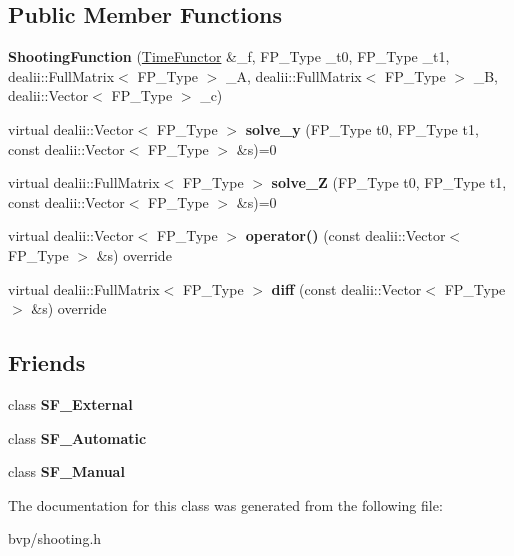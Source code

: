\subsection*{Public Member Functions}
\begin{DoxyCompactItemize}
\item 
\mbox{\label{classShootingFunction_ae73f34f210d7f6836b570ecca21f62c0}} 
{\bfseries Shooting\+Function} (\hyperlink{classTimeFunctor}{Time\+Functor} \&\+\_\+f, F\+P\+\_\+\+Type \+\_\+t0, F\+P\+\_\+\+Type \+\_\+t1, dealii\+::\+Full\+Matrix$<$ F\+P\+\_\+\+Type $>$ \+\_\+A, dealii\+::\+Full\+Matrix$<$ F\+P\+\_\+\+Type $>$ \+\_\+B, dealii\+::\+Vector$<$ F\+P\+\_\+\+Type $>$ \+\_\+c)
\item 
\mbox{\label{classShootingFunction_a2fff86465b3e0ee1e4e29d8691dbd8f5}} 
virtual dealii\+::\+Vector$<$ F\+P\+\_\+\+Type $>$ {\bfseries solve\+\_\+y} (F\+P\+\_\+\+Type t0, F\+P\+\_\+\+Type t1, const dealii\+::\+Vector$<$ F\+P\+\_\+\+Type $>$ \&s)=0
\item 
\mbox{\label{classShootingFunction_a679b8e1483215ced4212dd7acb0001f8}} 
virtual dealii\+::\+Full\+Matrix$<$ F\+P\+\_\+\+Type $>$ {\bfseries solve\+\_\+Z} (F\+P\+\_\+\+Type t0, F\+P\+\_\+\+Type t1, const dealii\+::\+Vector$<$ F\+P\+\_\+\+Type $>$ \&s)=0
\item 
\mbox{\label{classShootingFunction_a02ef732410cfd2168a865e550610d1cf}} 
virtual dealii\+::\+Vector$<$ F\+P\+\_\+\+Type $>$ {\bfseries operator()} (const dealii\+::\+Vector$<$ F\+P\+\_\+\+Type $>$ \&s) override
\item 
\mbox{\label{classShootingFunction_ae848d8431d042e8f1df5bff5f716ed38}} 
virtual dealii\+::\+Full\+Matrix$<$ F\+P\+\_\+\+Type $>$ {\bfseries diff} (const dealii\+::\+Vector$<$ F\+P\+\_\+\+Type $>$ \&s) override
\end{DoxyCompactItemize}
\subsection*{Friends}
\begin{DoxyCompactItemize}
\item 
\mbox{\label{classShootingFunction_a93dbf39ac4cbbc98d7d42b86d98179eb}} 
class {\bfseries S\+F\+\_\+\+External}
\item 
\mbox{\label{classShootingFunction_ab9857bb910ee9206e4888bdc358f0ecb}} 
class {\bfseries S\+F\+\_\+\+Automatic}
\item 
\mbox{\label{classShootingFunction_acf7e9fe888f96c8f5b3243c0848c0fcd}} 
class {\bfseries S\+F\+\_\+\+Manual}
\end{DoxyCompactItemize}


The documentation for this class was generated from the following file\+:\begin{DoxyCompactItemize}
\item 
bvp/shooting.\+h\end{DoxyCompactItemize}
